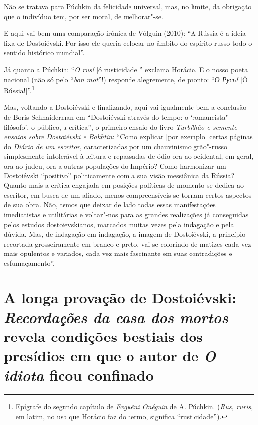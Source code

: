 Não se tratava para Púchkin da felicidade universal, mas, no limite, da
obrigação que o indivíduo tem, por ser moral, de melhorar"-se.

E aqui vai bem uma comparação irônica de Vólguin (2010): ``A
Rússia é a ideia fixa de Dostoiévski. Por isso ele queria colocar no
âmbito do espírito russo todo o sentido histórico mundial''.

Já quanto a Púchkin: ``\emph{O rus!} [ó rusticidade]'' exclama Horácio. E o nosso poeta
nacional (não só pelo ``\emph{bon mot}''!) responde alegremente, de pronto: ``\emph{О
Русь!} [Ó Rússia!]''.\footnote{Epígrafe do segundo capítulo de
\emph{Evguêni Onéguin} de A. Púchkin. (\emph{Rus, ruris}, em latim, no
uso que Horácio faz do termo, significa ``rusticidade'').}

Mas, voltando a Dostoiévski e finalizando, aqui vai igualmente bem a
conclusão de Boris Schnaiderman em ``Dostoiévski através do tempo:
o `romancista"-filósofo', o público, a crítica'', o primeiro ensaio
do livro \emph{Turbilhão e semente -- ensaios sobre Dostoiévski e
Bakhtin}: ``Como explicar [por exemplo] certas páginas do
\emph{Diário de um escritor}, caracterizadas por um chauvinismo
grão"-russo simplesmente intolerável à leitura e repassadas de ódio ora
ao ocidental, em geral, ora ao judeu, ora a outras populações do
Império? Como harmonizar um Dostoiévski ``positivo'' politicamente com a
sua visão messiânica da Rússia? Quanto mais a crítica engajada em
posições políticas de momento se dedica ao escritor, em busca de um
aliado, menos compreensíveis se tornam certos aspectos de sua obra. Não,
temos que deixar de lado todas essas manifestações imediatistas e
utilitárias e voltar"-nos para as grandes realizações já conseguidas
pelos estudos dostoievskianos, marcados muitas vezes pela indagação e
pela dúvida. Mas, de indagação em indagação, a imagem de Dostoiévski, a
princípio recortada grosseiramente em branco e preto, vai se colorindo
de matizes cada vez mais opulentos e variados, cada vez mais fascinante
em suas contradições e esfumaçamento''.




\chapter*{A longa provação de Dostoiévski: \emph{Recordações da casa dos mortos} revela condições bestiais dos presídios em que o autor de \emph{O idiota} ficou confinado}



